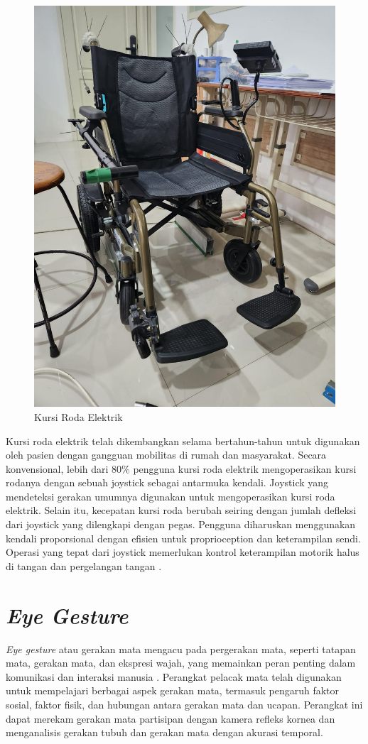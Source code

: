 \begin{figure}[H]
  \centering

  \includegraphics[width=.43\textwidth]{gambar/bab3/kursi.jpeg}

  \caption{Kursi Roda Elektrik}
  \label{fig:kursiroda}
\end{figure}

Kursi roda elektrik telah dikembangkan selama bertahun-tahun untuk digunakan oleh pasien dengan gangguan mobilitas di rumah dan masyarakat. Secara konvensional, lebih dari 80\% pengguna kursi roda elektrik mengoperasikan kursi rodanya dengan sebuah joystick sebagai antarmuka kendali. Joystick yang mendeteksi gerakan umumnya digunakan untuk mengoperasikan kursi roda elektrik. Selain itu, kecepatan kursi roda berubah seiring dengan jumlah defleksi dari joystick yang dilengkapi dengan pegas. Pengguna diharuskan menggunakan kendali proporsional dengan efisien untuk proprioception dan keterampilan sendi. Operasi yang tepat dari joystick memerlukan kontrol keterampilan motorik halus di tangan dan pergelangan tangan \parencite{koyama23}.

\newpage

\section{\emph{Eye Gesture}}

\textit{Eye gesture} atau gerakan mata mengacu pada pergerakan mata, seperti tatapan mata, gerakan mata, dan ekspresi wajah, yang memainkan peran penting dalam komunikasi dan interaksi manusia \parencite{vanni_2022}. Perangkat pelacak mata telah digunakan untuk mempelajari berbagai aspek gerakan mata, termasuk pengaruh faktor sosial, faktor fisik, dan hubungan antara gerakan mata dan ucapan. Perangkat ini dapat merekam gerakan mata partisipan dengan kamera refleks kornea dan menganalisis gerakan tubuh dan gerakan mata dengan akurasi temporal\parencite{gullberg_kita_2009}.

